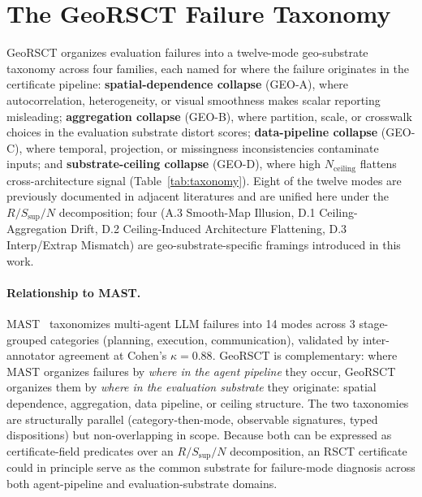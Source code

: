 \documentclass{article}
\begin{document}
\section{The GeoRSCT Failure Taxonomy}
\label{sec:taxonomy}

GeoRSCT organizes evaluation failures into a twelve-mode geo-substrate taxonomy across four families, each named for where the failure originates in the certificate pipeline: \textbf{spatial-dependence collapse} (GEO-A), where autocorrelation, heterogeneity, or visual smoothness makes scalar reporting misleading; \textbf{aggregation collapse} (GEO-B), where partition, scale, or crosswalk choices in the evaluation substrate distort scores; \textbf{data-pipeline collapse} (GEO-C), where temporal, projection, or missingness inconsistencies contaminate inputs; and \textbf{substrate-ceiling collapse} (GEO-D), where high $N_{\text{ceiling}}$ flattens cross-architecture signal (Table~\ref{tab:taxonomy}). Eight of the twelve modes are previously documented in adjacent literatures and are unified here under the $R/S_{\text{sup}}/N$ decomposition; four (A.3 Smooth-Map Illusion, D.1 Ceiling-Aggregation Drift, D.2 Ceiling-Induced Architecture Flattening, D.3 Interp/Extrap Mismatch) are geo-substrate-specific framings introduced in this work.

\paragraph{Relationship to MAST.} MAST~\citep{cemri2025mast} taxonomizes multi-agent LLM failures into 14 modes across 3 stage-grouped categories (planning, execution, communication), validated by inter-annotator agreement at Cohen's $\kappa = 0.88$. GeoRSCT is complementary: where MAST organizes failures by \emph{where in the agent pipeline} they occur, GeoRSCT organizes them by \emph{where in the evaluation substrate} they originate: spatial dependence, aggregation, data pipeline, or ceiling structure. The two taxonomies are structurally parallel (category-then-mode, observable signatures, typed dispositions) but non-overlapping in scope. Because both can be expressed as certificate-field predicates over an $R/S_{\text{sup}}/N$ decomposition, an RSCT certificate could in principle serve as the common substrate for failure-mode diagnosis across both agent-pipeline and evaluation-substrate domains.
\end{document}
